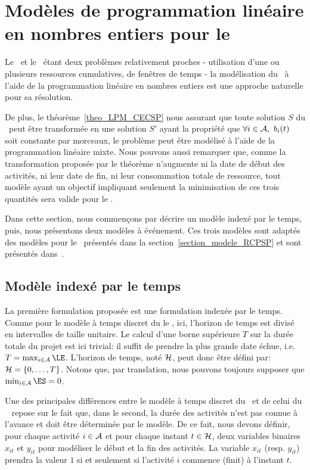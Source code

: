 \section{Modèles de programmation linéaire en nombres entiers pour le
\CECSP}

Le \CECSP ~et le \RCPSP~étant deux problèmes relativement proches -
utilisation d'une ou plusieurs ressources cumulatives, de fenêtres de
temps - la modélisation du \CECSP~à l'aide de la programmation
linéaire en nombres entiers est une approche naturelle pour
sa résolution. 

De plus, le théorème~\ref{theo_LPM_CECSP} nous assurant que toute solution
$S$ du \CECSP~peut être transformée en une solution $S'$ ayant la
propriété que $\forall i \in \A,\ b_i(t)$ soit constante par morceaux,
le problème peut être modélisé à l'aide de la programmation linéaire
mixte. Nous pouvons aussi remarquer que, comme la transformation
proposée par le théorème n'augmente ni la date de début des activités,
ni leur date de fin, ni leur consommation totale de ressource, tout modèle
ayant un objectif impliquant seulement la minimisation de ces trois
quantités sera valide pour le \CECSP.

Dans cette section, nous commençons par décrire un modèle indexé par
le temps, puis, nous présentons deux modèles à événement. Ces trois
modèles sont adaptés des modèles pour le \RCPSP~présentés dans la
section~\ref{section_modele_RCPSP} et sont présentés
dans~\cite{Nattaf_ORSpectrum}.  


\subsection{Modèle indexé par le temps}

La première formulation proposée est une formulation indexée par
le temps. Comme pour le modèle à temps discret du le \RCPSP,
ici, l'horizon de temps est divisé en intervalles de taille unitaire. Le
calcul d'une borne supérieure $T$ sur la durée totale du projet
est ici trivial: il suffit de prendre la plus grande date échue,
i.e. $T=\max_{i \in \A} \LE$. L'horizon de temps, noté
${\cal H}$, peut donc être défini par: ${\cal H}=\{0,\dots,T\}$.
Notons que, par translation, nous pouvons toujours supposer que
$\min_{i\in \A} \ES=0$.

Une des principales différences entre le modèle à temps discret du
\RCPSP~et de celui du \CECSP~ repose sur le fait que, dans le
second, la durée des activités n'est pas connue à l'avance et doit
être déterminée par le modèle. De ce fait, nous devons définir,
pour chaque activité $i \in {\cal A}$ et pour chaque instant $t
\in {\cal H}$, deux variables binaires $x_{it}$ et $y_{it}$ pour
modéliser le début et la fin des activités. La variable $x_{it}$
(resp. $y_{it}$) prendra la valeur $1$ si et seulement si
l'activité $i$ commence (finit) à l'instant $t$.

